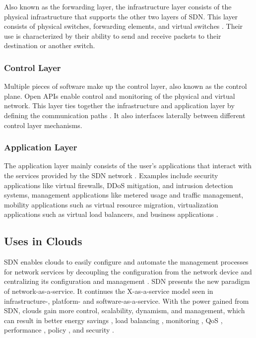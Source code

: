 \documentclass[12pt]{article}
\begin{document}
Also known as the forwarding layer, the infrastructure layer consists of the physical infrastructure that supports the other two layers of SDN. This layer consists of physical switches, forwarding elements, and virtual switches \cite{yan2016software}. Their use is characterized by their ability to send and receive packets to their destination or another switch.


\subsubsection{Control Layer}

Multiple pieces of software make up the control layer, also known as the control plane. Open APIs enable control and monitoring of the physical and virtual network. This layer ties together the infrastructure and application layer by defining the communication paths \cite{yan2016software}. It also interfaces laterally between different control layer mechanisms.


\subsubsection{Application Layer}

The application layer mainly consists of the user's applications that interact with the services provided by the SDN network \cite{yan2016software}. Examples include security applications like virtual firewalls, DDoS mitigation, and intrusion detection systems, management applications like metered usage and traffic management, mobility applications such as virtual resource migration, virtualization applications such as virtual load balancers, and business applications  \cite{larsen2012architecture}.



\subsection{Uses in Clouds}

SDN enables clouds to easily configure and automate the management processes for network services by decoupling the configuration from the network device and centralizing its configuration and management \cite{yan2016software}. SDN presents the new paradigm of network-as-a-service. It continues the X-as-a-service model seen in infrastructure-, platform- and software-as-a-service. With the power gained from SDN, clouds gain more control, scalability, dynamism, and management, which can result in better energy savings \cite{yen2014sdn,lin2013flow}, load balancing \cite{yen2014sdn}, monitoring \cite{yen2014sdn}, QoS \cite{akella2014quality}, performance \cite{cziva2014sdn, lin2013flow}, policy \cite{banikazemi2013meridian,akella2014quality}, and security \cite{seeber2014improving}.
\end{document}
